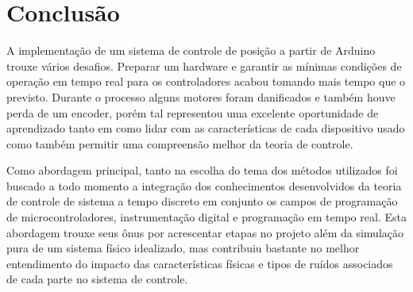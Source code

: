\documentclass[a4paper,11pt]{article}
\begin{document}







\section{Conclusão}

A implementação de um sistema de controle de posição a partir de Arduino trouxe vários desafios. Preparar um hardware e garantir as mínimas condições de operação em tempo real para os controladores acabou tomando mais tempo que o previsto. Durante o processo alguns motores foram danificados e também houve perda de um encoder, porém tal representou uma excelente oportunidade de aprendizado tanto em como lidar com as características de cada dispositivo usado como também permitir uma compreensão melhor da teoria de controle.

Como abordagem principal, tanto na escolha do tema dos métodos utilizados foi buscado a todo momento a integração dos conhecimentos desenvolvidos da teoria de controle de sistema a tempo discreto em conjunto os campos de programação de microcontroladores, instrumentação digital e programação em tempo real. Esta abordagem trouxe seus ônus por acrescentar etapas no projeto além da simulação pura de um sistema físico idealizado, mas contribuiu bastante no melhor entendimento do impacto das características físicas e tipos de ruídos associados de cada parte no sistema de controle.


\newpage

\nocite{matlabcontrol}
\nocite{matlabsymbolic}
\nocite{ogata2010modern}
\end{document}
